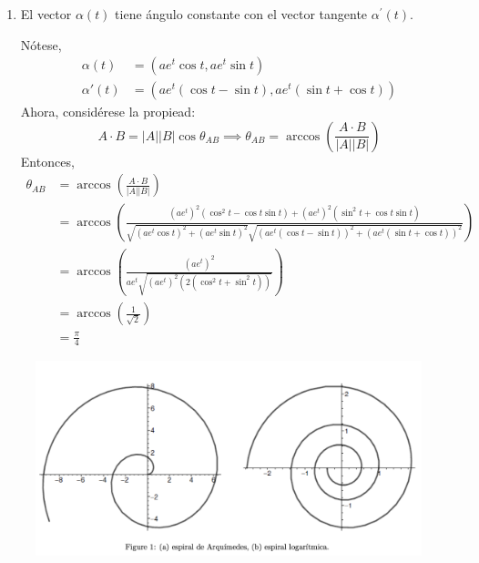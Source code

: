 \begin{problema}
\begin{enumerate}
\begin{sol}
    \end{sol}
    \item El vector $\alpha(t)$ tiene ángulo constante con el vector tangente $\alpha^{\prime}(t)$.
    \begin{sol}
        Nótese, 
        \begin{align*}
            \alpha(t) &= (ae^{t}\cos t,ae^{t}\sin t)\\
            \alpha'(t) &= \left(ae^{t}\left(\cos t -\sin t \right),ae^{t}\left(\sin t+ \cos t \right) \right)
        \end{align*}
        Ahora, considérese la propiead: 
        $$A\cdot B = |A||B|\cos\theta_{AB}\implies \theta_{AB}=\arccos\left(\frac{A\cdot B}{|A||B|}\right)$$
        Entonces, 
        \begin{align*}
            \theta_{AB}&=\arccos\left(\frac{A\cdot B}{|A||B|}\right)\\
            &= \arccos\left(\frac{(ae^{t})^2(\cos^2t -\cos t \sin t)+(ae^{t})^2(\sin^2 t +\cos t \sin t )}{\sqrt{(ae^{t}\cos t)^2+(ae^{t}\sin t)^2}\sqrt{(ae^{t}\left(\cos t -\sin t \right))^2+(ae^{t}\left(\sin t+ \cos t \right))^2}}\right)\\
            &= \arccos\left(\frac{(ae^t)^2}{ae^t\sqrt{(ae^t)^2 (2(\cos^2 t+\sin^2 t))}}\right)\\
            &= \arccos\left(\frac{1}{\sqrt{2}}\right)\\
            &= \frac{\pi}{4}
        \end{align*}
    \end{sol}
    
\end{enumerate}

\end{problema}

\begin{figure}[H]
    \centering
    \includegraphics[scale=0.5]{Problemas/gf.png}
\end{figure}


